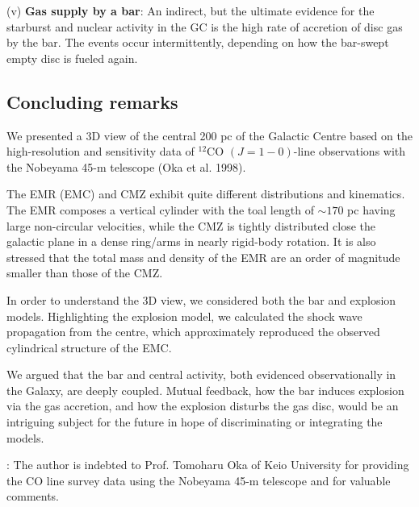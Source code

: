 \documentclass[useAMS,usenatbib]{mn2e}
\begin{document}
 (v) {\bf Gas supply by a bar}: An indirect, but the ultimate evidence for the starburst and nuclear activity in the GC is the high rate of accretion of disc gas by the bar. The events occur intermittently, depending on how the bar-swept empty disc is fueled again.  
 
\subsection{Concluding remarks}
 
We presented a 3D view of the central 200 pc of the Galactic Centre based on the high-resolution and sensitivity data of $^{12}$CO $(J=1-0)$-line observations with the Nobeyama 45-m telescope (Oka et al. 1998). 
 

The EMR (EMC) and CMZ exhibit quite different distributions and kinematics. The EMR composes a vertical cylinder with the toal length of $\sim 170$ pc having large non-circular velocities, while the CMZ is tightly distributed close the galactic plane in a dense ring/arms in nearly rigid-body rotation. It is also stressed that the total mass and density of the EMR are an order of magnitude smaller than those of the CMZ.

In order to understand the 3D view, we considered both the bar and explosion models. Highlighting the explosion model, we calculated the shock wave propagation from the centre, which approximately reproduced the observed cylindrical structure of the EMC. 

We argued that the bar and central activity, both evidenced observationally in the Galaxy, are deeply coupled. Mutual feedback, how the bar induces explosion via the gas accretion, and how the explosion disturbs the gas disc, would be an intriguing subject for the future in hope of discriminating or integrating the models.  

\vskip 5mm

: The author is indebted to Prof. Tomoharu Oka of Keio University for providing the CO line survey data using the Nobeyama 45-m telescope and for valuable comments.
 
\end{document}
